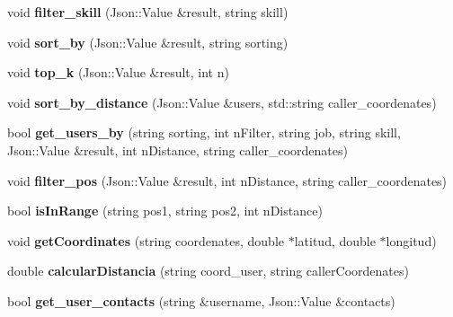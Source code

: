 \begin{DoxyCompactItemize}
\item 
void {\bfseries filter\+\_\+skill} (Json\+::\+Value \&result, string skill)\hypertarget{classUsersDB_a4117cc7e6be9058fd6f5fa97d4ded944}{}\label{classUsersDB_a4117cc7e6be9058fd6f5fa97d4ded944}

\item 
void {\bfseries sort\+\_\+by} (Json\+::\+Value \&result, string sorting)\hypertarget{classUsersDB_aa384c046e3afe444166b72d3b91abc51}{}\label{classUsersDB_aa384c046e3afe444166b72d3b91abc51}

\item 
void {\bfseries top\+\_\+k} (Json\+::\+Value \&result, int n)\hypertarget{classUsersDB_af40b6c7cee16f062e8d746b69af4dfcf}{}\label{classUsersDB_af40b6c7cee16f062e8d746b69af4dfcf}

\item 
void {\bfseries sort\+\_\+by\+\_\+distance} (Json\+::\+Value \&users, std\+::string caller\+\_\+coordenates)\hypertarget{classUsersDB_a6627ef8e0d9df316a3029e6614b078bc}{}\label{classUsersDB_a6627ef8e0d9df316a3029e6614b078bc}

\item 
bool {\bfseries get\+\_\+users\+\_\+by} (string sorting, int n\+Filter, string job, string skill, Json\+::\+Value \&result, int n\+Distance, string caller\+\_\+coordenates)\hypertarget{classUsersDB_a5f2166f6887461712e493629e5452345}{}\label{classUsersDB_a5f2166f6887461712e493629e5452345}

\item 
void {\bfseries filter\+\_\+pos} (Json\+::\+Value \&result, int n\+Distance, string caller\+\_\+coordenates)\hypertarget{classUsersDB_ac7fc736d2e6f84318c8607039f330a68}{}\label{classUsersDB_ac7fc736d2e6f84318c8607039f330a68}

\item 
bool {\bfseries is\+In\+Range} (string pos1, string pos2, int n\+Distance)\hypertarget{classUsersDB_ad28f2d52e067511ded5925f92244d9ee}{}\label{classUsersDB_ad28f2d52e067511ded5925f92244d9ee}

\item 
void {\bfseries get\+Coordinates} (string coordenates, double $\ast$latitud, double $\ast$longitud)\hypertarget{classUsersDB_aa288dec58dd9d1c641900d912e6d860e}{}\label{classUsersDB_aa288dec58dd9d1c641900d912e6d860e}

\item 
double {\bfseries calcular\+Distancia} (string coord\+\_\+user, string caller\+Coordenates)\hypertarget{classUsersDB_a06914c45497f9ef6e10e5d688fb64251}{}\label{classUsersDB_a06914c45497f9ef6e10e5d688fb64251}

\item 
bool {\bfseries get\+\_\+user\+\_\+contacts} (string \&username, Json\+::\+Value \&contacts)\hypertarget{classUsersDB_a292ccc85cf70e7c3f2248cfd76a0e630}{}\label{classUsersDB_a292ccc85cf70e7c3f2248cfd76a0e630}

\end{DoxyCompactItemize}
